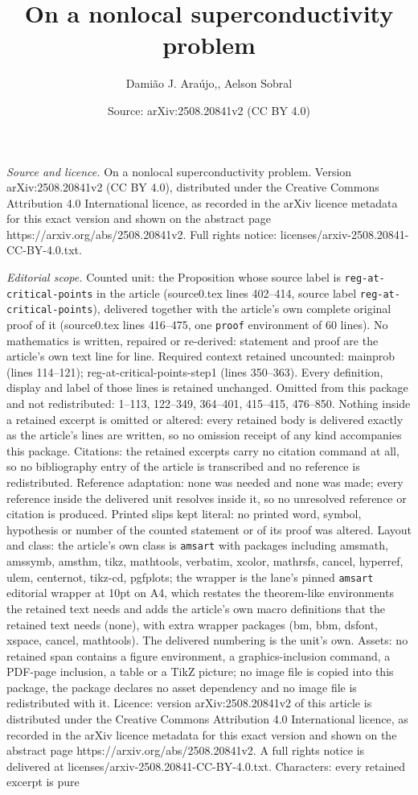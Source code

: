 \documentclass[10pt,a4paper]{amsart}
\title[On a nonlocal superconductivity problem]{On a nonlocal superconductivity problem}
\author{Dami\~ao J. Ara\'ujo,, Aelson Sobral}
\date{Source: arXiv:2508.20841v2 (CC BY 4.0)}
\begin{document}
\maketitle

\noindent\emph{Source and licence.} On a nonlocal superconductivity problem. Version arXiv:2508.20841v2 (CC BY 4.0), distributed under the Creative Commons Attribution 4.0 International licence, as recorded in the arXiv licence metadata for this exact version and shown on the abstract page https://arxiv.org/abs/2508.20841v2. Full rights notice: licenses/arxiv-2508.20841-CC-BY-4.0.txt.\par\smallskip

\noindent\textit{Editorial scope.} Counted unit: the Proposition whose source label is \texttt{reg-at-critical-points} in the article (source0.tex lines 402--414, source label \texttt{reg-at-critical-points}), delivered together with the article's own complete original proof of it (source0.tex lines 416--475, one \texttt{proof} environment of 60 lines). No mathematics is written, repaired or re-derived: statement and proof are the article's own text line for line. Required context retained uncounted: mainprob (lines 114--121); reg-at-critical-points-step1 (lines 350--363). Every definition, display and label of those lines is retained unchanged. Omitted from this package and not redistributed: 1--113, 122--349, 364--401, 415--415, 476--850. Nothing inside a retained excerpt is omitted or altered: every retained body is delivered exactly as the article's lines are written, so no omission receipt of any kind accompanies this package. Citations: the retained excerpts carry no citation command at all, so no bibliography entry of the article is transcribed and no reference is redistributed. Reference adaptation: none was needed and none was made; every reference inside the delivered unit resolves inside it, so no unresolved reference or citation is produced. Printed slips kept literal: no printed word, symbol, hypothesis or number of the counted statement or of its proof was altered. Layout and class: the article's own class is \texttt{amsart} with packages including amsmath, amssymb, amsthm, tikz, mathtools, verbatim, xcolor, mathrsfs, cancel, hyperref, ulem, centernot, tikz-cd, pgfplots; the wrapper is the lane's pinned \texttt{amsart} editorial wrapper at 10pt on A4, which restates the theorem-like environments the retained text needs and adds the article's own macro definitions that the retained text needs (none), with extra wrapper packages (bm, bbm, dsfont, xspace, cancel, mathtools). The delivered numbering is the unit's own. Assets: no retained span contains a figure environment, a graphics-inclusion command, a PDF-page inclusion, a table or a TikZ picture; no image file is copied into this package, the package declares no asset dependency and no image file is redistributed with it. Licence: version arXiv:2508.20841v2 of this article is distributed under the Creative Commons Attribution 4.0 International licence, as recorded in the arXiv licence metadata for this exact version and shown on the abstract page https://arxiv.org/abs/2508.20841v2. A full rights notice is delivered at licenses/arxiv-2508.20841-CC-BY-4.0.txt. Characters: every retained excerpt is pure 
\end{document}
